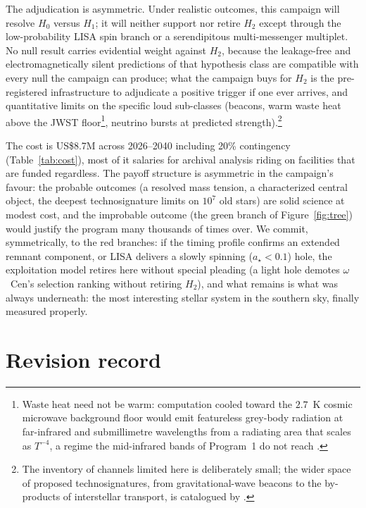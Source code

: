 \documentclass[11pt]{article}
\newcommand{\astar}{\ensuremath{a_\star}}
\newcommand{\ocen}{\ensuremath{\omega}~Cen}
\begin{document}
The adjudication is asymmetric. Under realistic outcomes, this campaign will resolve $H_0$ versus $H_1$; it will neither support nor retire $H_2$ except through the low-probability LISA spin branch or a serendipitous multi-messenger multiplet. No null result carries evidential weight against $H_2$, because the leakage-free and electromagnetically silent predictions of that hypothesis class are compatible with every null the campaign can produce; what the campaign buys for $H_2$ is the pre-registered infrastructure to adjudicate a positive trigger if one ever arrives, and quantitative limits on the specific loud sub-classes (beacons, warm waste heat above the JWST floor\footnote{Waste heat need not be warm: computation cooled toward the $2.7$~K cosmic microwave background floor would emit featureless grey-body radiation at far-infrared and submillimetre wavelengths from a radiating area that scales as $T^{-4}$, a regime the mid-infrared bands of Program~1 do not reach \citep{Garrett2026Slysh}.}, neutrino bursts at predicted strength).\footnote{The inventory of channels limited here is deliberately small; the wider space of proposed technosignatures, from gravitational-wave beacons to the by-products of interstellar transport, is catalogued by \citet{JacksonBenford2020}.}

The cost is US\$8.7M across 2026--2040 including 20\% contingency (Table~\ref{tab:cost}), most of it salaries for archival analysis riding on facilities that are funded regardless. The payoff structure is asymmetric in the campaign's favour: the probable outcomes (a resolved mass tension, a characterized central object, the deepest technosignature limits on $10^{7}$ old stars) are solid science at modest cost, and the improbable outcome (the green branch of Figure~\ref{fig:tree}) would justify the program many thousands of times over. We commit, symmetrically, to the red branches: if the timing profile confirms an extended remnant component, or LISA delivers a slowly spinning ($\astar < 0.1$) hole, the exploitation model retires here without special pleading (a light hole demotes \ocen's selection ranking without retiring $H_2$), and what remains is what was always underneath: the most interesting stellar system in the southern sky, finally measured properly.

\section{Revision record}
\label{app:revision}
\end{document}
